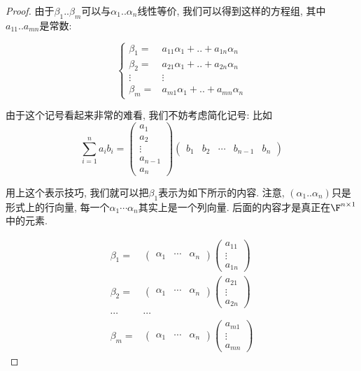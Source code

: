 \begin{proof}
由于$\beta_{1}..\beta_{m}$可以与$\alpha_{1}..\alpha_{n}$线性等价, 我们可以得到这样的方程组,
其中$a_{11}..a_{mn}$是常数: 

\[
\begin{cases}
\beta_{1}= & a_{11}\alpha_{1}+..+a_{1n}\alpha_{n}\\
\beta_{2}= & a_{21}\alpha_{1}+..+a_{2n}\alpha_{n}\\
\vdots & \vdots\\
\beta_{m}= & a_{m1}\alpha_{1}+..+a_{mn}\alpha_{n}
\end{cases}
\]

由于这个记号看起来非常的难看, 我们不妨考虑简化记号: 比如
\[
\sum_{i=1}^{n}a_{i}b_{i}=\begin{pmatrix}a_{1}\\
a_{2}\\
\vdots\\
a_{n-1}\\
a_{n}
\end{pmatrix}\begin{pmatrix}b_{1} & b_{2} & \cdots & b_{n-1} & b_{n}\end{pmatrix}
\]

用上这个表示技巧, 我们就可以把$\beta_{1}$表示为如下所示的内容. 注意, $(\alpha_{1}..\alpha_{n})$只是形式上的行向量,
每一个$\alpha_{1}\cdots\alpha_{n}$其实上是一个列向量. 后面的内容才是真正在$\F^{n\times1}$中的元素.

\begin{align*}
\beta_{1}= & \begin{pmatrix}\alpha_{1} & \cdots & \alpha_{n}\end{pmatrix}\begin{pmatrix}a_{11}\\
\vdots\\
a_{1n}
\end{pmatrix}\\
\beta_{2}= & \begin{pmatrix}\alpha_{1} & \cdots & \alpha_{n}\end{pmatrix}\begin{pmatrix}a_{21}\\
\vdots\\
a_{2n}
\end{pmatrix}\\
\cdots & \cdots\\
\beta_{m}= & \begin{pmatrix}\alpha_{1} & \cdots & \alpha_{n}\end{pmatrix}\begin{pmatrix}a_{m1}\\
\vdots\\
a_{mn}
\end{pmatrix}
\end{align*}


\end{proof}
